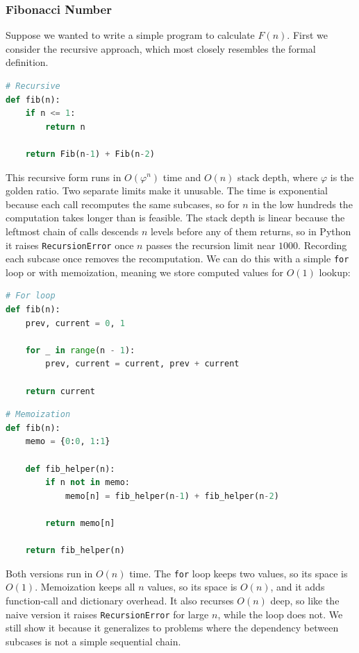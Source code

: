 \subsubsection{Fibonacci Number}

\medskip

Suppose we wanted to write a simple program to calculate $F(n)$. First we consider the recursive approach, which most closely resembles the formal definition.

\medskip

\begin{lstlisting}[language=Python]
# Recursive
def fib(n):
    if n <= 1:
        return n

    return Fib(n-1) + Fib(n-2)
\end{lstlisting}

This recursive form runs in $O(\varphi^n)$ time and $O(n)$ stack depth, where $\varphi$ is the golden ratio. Two separate limits make it unusable. The time is exponential because each call recomputes the same subcases, so for $n$ in the low hundreds the computation takes longer than is feasible. The stack depth is linear because the leftmost chain of calls descends $n$ levels before any of them returns, so in Python it raises \texttt{RecursionError} once $n$ passes the recursion limit near $1000$. Recording each subcase once removes the recomputation. We can do this with a simple \texttt{for} loop or with memoization, meaning we store computed values for $O(1)$ lookup:

\newpage

\begin{lstlisting}[language=Python]
# For loop
def fib(n):
    prev, current = 0, 1

    for _ in range(n - 1):
        prev, current = current, prev + current

    return current
\end{lstlisting}

\begin{lstlisting}[language=Python]
# Memoization
def fib(n):
    memo = {0:0, 1:1}

    def fib_helper(n):
        if n not in memo:
            memo[n] = fib_helper(n-1) + fib_helper(n-2)

        return memo[n]

    return fib_helper(n)
\end{lstlisting}

Both versions run in $O(n)$ time. The \texttt{for} loop keeps two values, so its space is $O(1)$. Memoization keeps all $n$ values, so its space is $O(n)$, and it adds function-call and dictionary overhead. It also recurses $O(n)$ deep, so like the naive version it raises \texttt{RecursionError} for large $n$, while the loop does not. We still show it because it generalizes to problems where the dependency between subcases is not a simple sequential chain.

